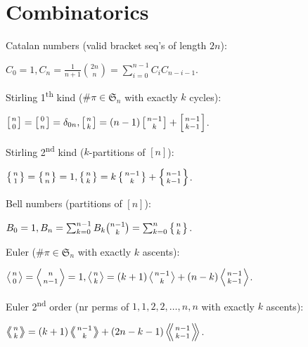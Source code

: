 \section{Combinatorics}

\begin{myitemize}
	\item Catalan numbers (valid bracket seq's of length $2n$):

		$C_0 = 1, C_n = \frac{1}{n+1}\binom{2n}{n} = \sum_{i=0}^{n-1}C_iC_{n-i-1}$.

	\item Stirling 1\textsuperscript{th} kind ($\# \pi \in \mathfrak{S}_n$ with exactly $k$ cycles):

		$\left[{n\atop 0}\right]=\left[{0\atop n}\right] = \delta_{0n}, \left[{n\atop k}\right]=(n-1)\left[{n-1\atop k}\right]+\left[{n-1\atop k-1}\right]$.

	\item Stirling 2\textsuperscript{nd} kind ($k$-partitions of $[n]$):

		$\left\{{n\atop 1}\right\}=\left\{{n\atop n}\right\}=1, \left\{{n\atop k}\right\} = k \left\{{ n-1 \atop k }\right\} + \left\{{n-1\atop k-1}\right\}$.

    \item Bell numbers (partitions of $[n]$):

		$B_0 = 1, B_n = \sum_{k=0}^{n-1} B_k \binom{n-1}{k} = \sum_{k=0}^n\left\{{n\atop k}\right\}$.

	\item Euler ($\# \pi \in \mathfrak{S}_n$ with exactly $k$ ascents):

		$\left \langle {n\atop 0} \right \rangle = \left \langle {n\atop n-1} \right \rangle = 1, \left \langle {n\atop k} \right \rangle = (k+1) \left \langle {n-1\atop {k}} \right \rangle + (n-k)\left \langle {{n-1}\atop {k-1}} \right \rangle$.

	\item Euler 2\textsuperscript{nd} order (nr perms of ${1, 1, 2, 2, \dots, n, n}$ with exactly $k$ ascents):

		$\left \langle \!\!\left \langle {n\atop k} \right \rangle \!\! \right \rangle = (k+1) \left \langle \!\! \left \langle {{n-1}\atop {k}} \right \rangle \!\! \right \rangle +(2n-k-1)\left \langle \!\! \left \langle {{n-1}\atop {k-1}} \right \rangle  \!\! \right \rangle$.


\end{myitemize}

